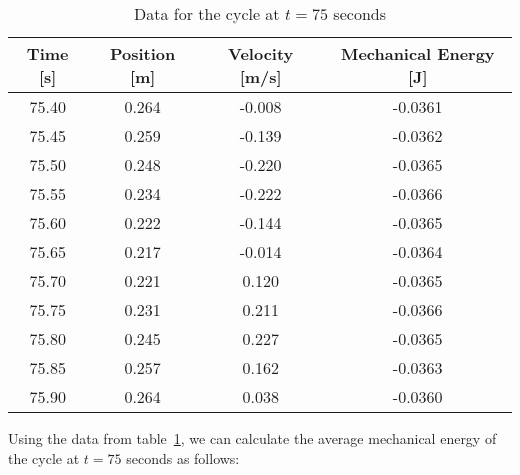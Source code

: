\documentclass{article}
\begin{document}
            \begin{table}[H]
                \centering
                \begin{tabular}{|c|c|c|c|}
                    \hline
                    Time [s] & Position [m] & Velocity [m/s] & Mechanical Energy [J] \\
                    \hline
                    75.40    & 0.264        & -0.008         & -0.0361               \\
                    \hline
                    75.45    & 0.259        & -0.139         & -0.0362               \\
                    \hline
                    75.50    & 0.248        & -0.220         & -0.0365               \\
                    \hline
                    75.55    & 0.234        & -0.222         & -0.0366               \\
                    \hline
                    75.60    & 0.222        & -0.144         & -0.0365               \\
                    \hline
                    75.65    & 0.217        & -0.014         & -0.0364               \\
                    \hline
                    75.70    & 0.221        & 0.120          & -0.0365               \\
                    \hline
                    75.75    & 0.231        & 0.211          & -0.0366               \\
                    \hline
                    75.80    & 0.245        & 0.227          & -0.0365               \\
                    \hline
                    75.85    & 0.257        & 0.162          & -0.0363               \\
                    \hline
                    75.90    & 0.264        & 0.038          & -0.0360               \\
                    \hline
                \end{tabular} %
                \caption{Data for the cycle at $t=75$ seconds}\label{tab:cycle-at-75-seconds-mechanical-energy-table}
            \end{table}
            
            Using the data from table~\ref{tab:cycle-at-75-seconds-mechanical-energy-table}, we can calculate the average mechanical energy of the cycle at $t=75$ seconds as follows:
            
\end{document}

